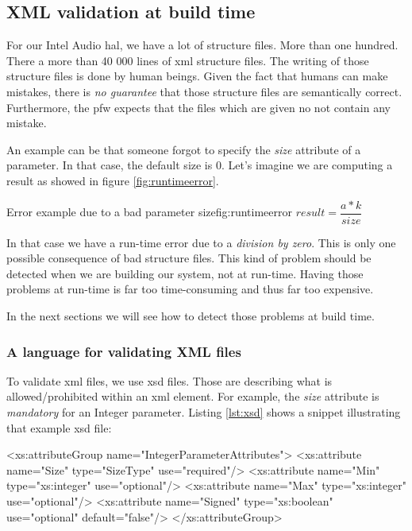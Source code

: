 \subsection{XML validation at build time}

For our Intel Audio \gls{hal}, we have a lot of structure files. More than one hundred.
There a more than 40 000 lines of \gls{xml} structure files.
The writing of those structure files is done by human beings. Given the fact
that humans can make mistakes, there is \emph{no guarantee} that those structure files are semantically correct.
Furthermore, the \gls{pfw} expects that the files which are given no not contain any mistake.

An example can be that someone forgot to specify the \emph{size} attribute of a parameter.
In that case, the default size is $0$. Let's imagine we are computing a result as showed in figure \ref{fig:runtimeerror}.

\begin{figureGraphics}{Error example due to a bad parameter size}{fig:runtimeerror}
    $result = \dfrac{a*k}{size}$
    \vspace{0.3cm}
\end{figureGraphics}

In that case we have a run-time error due to a \emph{division by zero}. This is only one possible consequence of bad structure files.
This kind of problem should be detected when we are building our system, not at run-time. Having those problems at
run-time is far too time-consuming and thus far too expensive.

In the next sections we will see how to detect those problems at build time.

\subsubsection{A language for validating XML files}

To validate \gls{xml} files, we use \gls{xsd} files.
Those are describing what is allowed/prohibited within an \gls{xml} element. For example, the \emph{size} attribute is
\emph{mandatory} for an Integer parameter.
Listing \ref{lst:xsd} shows a snippet illustrating that example \gls{xsd} file:

\begin{code}[language=XML, caption=XSD rules for an Integer parameter, label=lst:xsd]
<xs:attributeGroup name="IntegerParameterAttributes">
    <xs:attribute name="Size" type="SizeType" use="required"/>
    <xs:attribute name="Min" type="xs:integer" use="optional"/>
    <xs:attribute name="Max" type="xs:integer" use="optional"/>
    <xs:attribute name="Signed" type="xs:boolean" use="optional" default="false"/>
</xs:attributeGroup>
\end{code}

